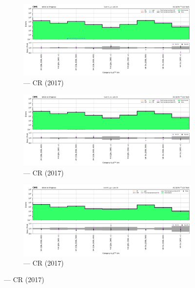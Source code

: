 \begin{figure}[htbp]
    \centering
    \begin{subfigure}[b]{0.66\textwidth}
        \includegraphics[width=\textwidth]{chapters/higgstoinv/figures/mountain_ranges/2017/VH/Wmunu_tree_fit_s-abs_values_VH_cats.pdf}
        \caption{\VH --- \singleMuCr \gls{CR} (2017)}
    \end{subfigure}

    \begin{subfigure}[b]{0.66\textwidth}
        \includegraphics[width=\textwidth]{chapters/higgstoinv/figures/mountain_ranges/2017/VH/Wenu_tree_fit_s-abs_values_VH_cats.pdf}
        \caption{\VH --- \singleEleCr \gls{CR} (2017)}
    \end{subfigure}

    \begin{subfigure}[b]{0.66\textwidth}
        \includegraphics[width=\textwidth]{chapters/higgstoinv/figures/mountain_ranges/2017/VH/Zmumu_tree_fit_s-abs_values_VH_cats.pdf}
        \caption{\VH --- \doubleMuCr \gls{CR} (2017)}
    \end{subfigure}


\end{figure}
